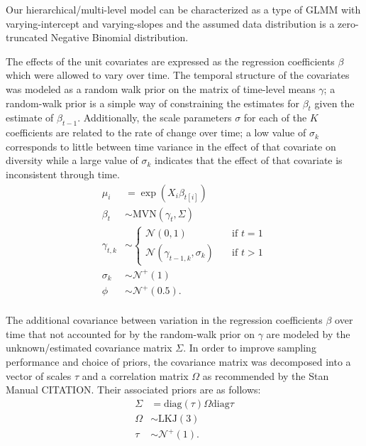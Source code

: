 \documentclass[12pt,letterpaper]{article}
\begin{document}
Our hierarchical/multi-level model can be characterized as a type of GLMM with varying-intercept and varying-slopes and the assumed data distribution is a zero-truncated Negative Binomial distribution.

The effects of the unit covariates are expressed as the regression coefficients \(\beta\) which were allowed to vary over time. The temporal structure of the covariates was modeled as a random walk prior on the matrix of time-level means \(\gamma\); a random-walk prior is a simple way of constraining the estimates for \(\beta_{t}\) given the estimate of \(\beta_{t - 1}\). Additionally, the scale parameters \(\sigma\) for each of the \(K\) coefficients are related to the rate of change over time; a low value of \(\sigma_{k}\) corresponds to little between time variance in the effect of that covariate on diversity while a large value of \(\sigma_{k}\) indicates that the effect of that covariate is inconsistent through time.
\begin{equation}
  \begin{aligned}
    \mu_{i} &= \exp(X_{i} \beta_{t[i]}) \\
    \beta_{t} &\sim \text{MVN}(\gamma_{t}, \Sigma) \\
    \gamma_{t, k} &\sim 
      \begin{cases}
        \mathcal{N}(0, 1) & \quad \text{if } t = 1 \\
        \mathcal{N}(\gamma_{t - 1, k}, \sigma_{k}) & \quad \text{if } t > 1
      \end{cases} \\
    \sigma_{k} &\sim \mathcal{N}^{+}(1) \\ 
    \phi &\sim \mathcal{N}^{+}(0.5). \\
  \end{aligned}
\end{equation}

The additional covariance between variation in the regression coefficients \(\beta\) over time that not accounted for by the random-walk prior on \(\gamma\) are modeled by the unknown/estimated covariance matrix \(\Sigma\). In order to improve sampling performance and choice of priors, the covariance matrix was decomposed into a vector of scales \(\tau\) and a correlation matrix \(\Omega\) as recommended by the Stan Manual CITATION. Their associated priors are as follows:
\begin{equation}
  \begin{aligned}
    \Sigma &= \text{diag}(\tau) \Omega \text{diag}{\tau} \\
    \Omega &\sim \text{LKJ}(3) \\
    \tau &\sim \mathcal{N}^{+}(1). \\
  \end{aligned}
\end{equation}
\end{document}
